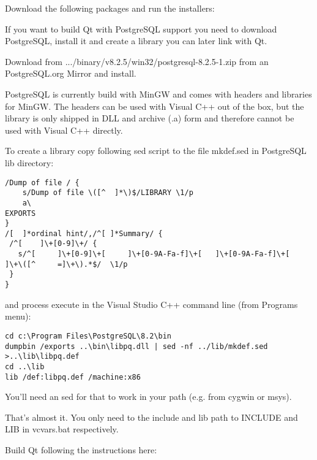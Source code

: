 Download the following packages and run the installers:

	\begin{quotation}
	\end{quotation}

	\begin{quotation}
	\end{quotation}

If you want to build Qt with PostgreSQL support you need to download
PostgreSQL, install it and create a library you can later link with Qt.

Download from .../binary/v8.2.5/win32/postgresql-8.2.5-1.zip from an
PostgreSQL.org Mirror and install.

PostgreSQL is currently build with MinGW and comes with headers and libraries
for MinGW.  The headers can be used with Visual C++ out of the box, but the library
is only shipped in DLL and archive (.a) form and therefore cannot be used with
Visual C++ directly.

To create a library copy following sed script to the file mkdef.sed in
PostgreSQL lib directory:

\begin{verbatim}
/Dump of file / {
	s/Dump of file \([^	 ]*\)$/LIBRARY \1/p
	a\
EXPORTS
}
/[ 	]*ordinal hint/,/^[	]*Summary/ {
 /^[ 	]\+[0-9]\+/ {
   s/^[ 	]\+[0-9]\+[ 	]\+[0-9A-Fa-f]\+[ 	]\+[0-9A-Fa-f]\+[ 	]\+\([^ 	=]\+\).*$/	\1/p
 }
}
\end{verbatim}

and process execute in the Visual Studio C++ command line (from Programs menu):

\begin{verbatim}
cd c:\Program Files\PostgreSQL\8.2\bin
dumpbin /exports ..\bin\libpq.dll | sed -nf ../lib/mkdef.sed >..\lib\libpq.def
cd ..\lib
lib /def:libpq.def /machine:x86
\end{verbatim}

You'll need an sed for that to work in your path (e.g. from cygwin or msys).

That's almost it.  You only need to the include and lib path to INCLUDE and LIB
in vcvars.bat respectively.

Build Qt following the instructions here:

